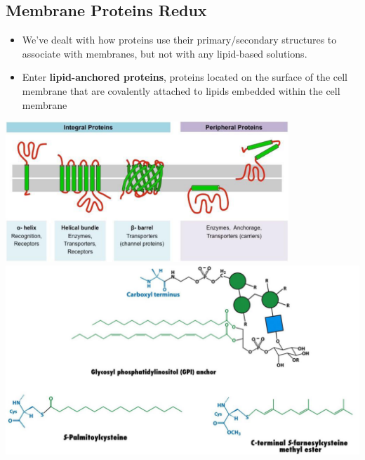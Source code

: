 \documentclass[10pt]{article}
\begin{document}
\subsection*{Membrane Proteins Redux}
\begin{itemize}
    \item We've dealt with how proteins use their primary/secondary structures to associate with membranes, but not with any lipid-based solutions.
    \item Enter \textbf{lipid-anchored proteins}, proteins located on the surface of the cell membrane that are covalently attached to lipids embedded within the cell membrane
\end{itemize}
\begin{center}
    \includegraphics*[width=0.8\textwidth]{L4_6.png}
    \includegraphics*[width=\textwidth]{L4_7.png}
\end{center}
\end{document}

